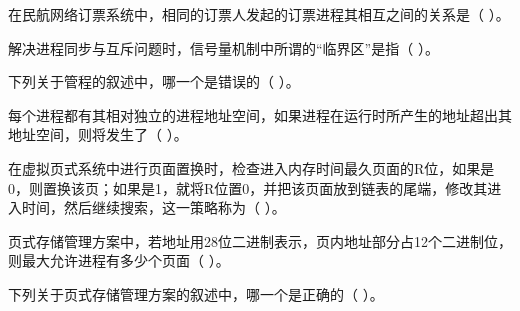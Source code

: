 \begin{qitems}[startnum=1]
\begin{bbox}
\qitem 在民航网络订票系统中，相同的订票人发起的订票进程其相互之间的关系是（ ）。\par
{}
\end{bbox}

\begin{bbox}
\qitem 解决进程同步与互斥问题时，信号量机制中所谓的“临界区”是指（ ）。\par
{}
\end{bbox}

\begin{bbox}
\qitem 下列关于管程的叙述中，哪一个是错误的（ ）。\par
{}
\end{bbox}

\begin{bbox}
\qitem 每个进程都有其相对独立的进程地址空间，如果进程在运行时所产生的地址超出其地址空间，则将发生了（ ）。\par
{}
\end{bbox}

\begin{bbox}
\qitem 在虚拟页式系统中进行页面置换时，检查进入内存时间最久页面的R位，如果是0，则置换该页；如果是1，就将R位置0，并把该页面放到链表的尾端，修改其进入时间，然后继续搜索，这一策略称为（ ）。\par
{}
\end{bbox}

\begin{bbox}
\qitem 页式存储管理方案中，若地址用28位二进制表示，页内地址部分占12个二进制位，则最大允许进程有多少个页面（ ）。\par
{}
\end{bbox}

\begin{bbox}
\qitem 下列关于页式存储管理方案的叙述中，哪一个是正确的（ ）。\par
{}
\end{bbox}


\end{qitems}
